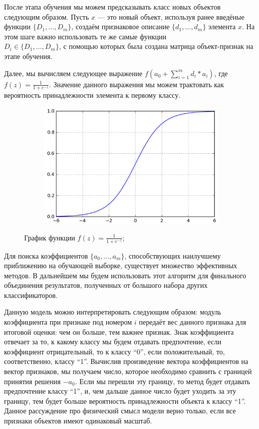 После этапа обучения мы можем предсказывать класс новых объектов следующим образом. Пусть $x$ — это новый объект, используя ранее введёные функции $\{D_1, \dots, D_m \}$, создаём признаковое описание $\{d_1,…,d_m\}$ элемента $x$. На этом шаге важно использовать те же самые функции \\ $D_i \in \{D_1, \dots, D_m \}$, с помощью которых была создана матрица объект-признак на этапе обучения.

Далее, мы вычисляем следующее выражение $ f \left( a_0 + \sum_{i=1}^{m} d_i * a_i \right)$, где $f \left( z \right) = \frac{1}{1 + e^{-z}}$. Значение данного выражения мы можем трактовать как вероятность принадлежности элемента к первому классу.

\begin{figure}[ht]
	\centering
    \begin{subfigure}[b]{1\textwidth}
    \centering
        \includegraphics[scale=0.5]{pasted-image-15.png}
    \end{subfigure}
 
    \caption{График функции $f \left( z \right) = \frac{1}{1 + e^{-z}}$;}
    \label{fig_parsetree}
\end{figure}

Для поиска коэффициентов $\{a_0,…,a_m\}$, способствующих наилучшему приближению на обучающей выборке, существует множество эффективных методов. В дальнейшем мы будем использовать этот алгоритм для финального объединения результатов, полученных от большого набора других классификаторов. 

Данную модель можно интерпретировать следующим образом: модуль коэффициента при признаке под номером $i$ передаёт вес данного признака для итоговой оценки: чем он больше, тем важнее признак. Знак коэффициента отвечает за то, к какому классу мы будем отдавать предпочтение, если коэффициент отрицательный, то к классу “0”, если положительный, то, соответственно, классу “1”. Вычислив произведение вектора коэффициентов на вектор признаков, мы получаем число, которое необходимо сравнить с границей принятия решения $-a_0$. Если мы перешли эту границу, то метод будет отдавать предпочтение классу “1”, и, чем дальше данное число будет уходить за эту границу, тем будет больше вероятность принадлежности объекта к классу “1”. Данное рассуждение про физический смысл модели верно только, если все признаки объектов имеют одинаковый масштаб.

